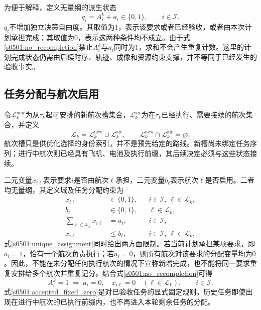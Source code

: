 为便于解释，定义无量纲的派生状态
\begin{equation}
 q_i=A_i^k+a_i\in\{0,1\},\qquad i\in\mathcal I.
 \label{s0501:combined_completion}
\end{equation}
$q_i$不增加独立决策自由度。其取值为$1$，表示该要求或者已经验收，或者由本次计划承担完成；其取值为$0$，表示这两种条件均不成立。由于式\eqref{s0501:no_recompletion}禁止$A_i^k$与$a_i$同时为$1$，求和不会产生重复计数。这里的计划完成状态仍需由后续时序、轨迹、成像和资源约束支撑，并不等同于已经发生的验收事实。

\subsection{任务分配与航次启用}

令$\mathcal L_k^{\mathrm{new}}$为从$\tau_k$起可安排的新航次槽集合，$\mathcal L_k^{\mathrm{air}}$为在$\tau_k$已经执行、需要接续的航次集合，并定义
\begin{equation}
 \mathcal L_k=\mathcal L_k^{\mathrm{new}}\cup\mathcal L_k^{\mathrm{air}},\qquad
 \mathcal L_k^{\mathrm{new}}\cap\mathcal L_k^{\mathrm{air}}=\varnothing.
 \label{s0501:sortie_sets}
\end{equation}
航次槽只是供优化选择的身份索引，并不是预先给定的路线。新槽尚未绑定任务序列；进行中航次则已经具有飞机、电池及执行前缀，其后续决定必须与这些状态接续。

二元变量$x_{i\ell}$表示要求$i$是否由航次$\ell$承担，二元变量$b_\ell$表示航次$\ell$是否启用。二者均无量纲，其定义域及任务分配约束为
\begin{align}
 x_{i\ell}&\in\{0,1\},
 &&i\in\mathcal I,\ \ell\in\mathcal L_k,
 \label{s0501:assignment_domain}\\
 b_\ell&\in\{0,1\},
 &&\ell\in\mathcal L_k,
 \label{s0501:activation_domain}\\
 \sum_{\ell\in\mathcal L_k}x_{i\ell}&=a_i,
 &&i\in\mathcal I,
 \label{s0501:unique_assignment}\\
 x_{i\ell}&\le b_\ell,
 &&i\in\mathcal I,\ \ell\in\mathcal L_k.
 \label{s0501:assignment_activation}
\end{align}
式\eqref{s0501:unique_assignment}同时给出两方面限制。若当前计划承担某项要求，即$a_i=1$，恰有一个航次负责执行；若$a_i=0$，则所有航次对该要求的分配变量均为$0$。因此，不能在未分配任何执行航次的情况下宣称新增完成，也不能将同一要求重复安排给多个航次并重复记分。结合式\eqref{s0501:no_recompletion}可得
\begin{equation}
 A_i^k=1\ \Longrightarrow\ 
 a_i=0,\quad x_{i\ell}=0\quad(\ell\in\mathcal L_k),
 \qquad i\in\mathcal I.
 \label{s0501:accepted_fixed_zero}
\end{equation}
式\eqref{s0501:accepted_fixed_zero}是对已验收任务的显式固定规则。历史任务即使出现在进行中航次的已执行前缀内，也不再进入本轮剩余任务的分配。

